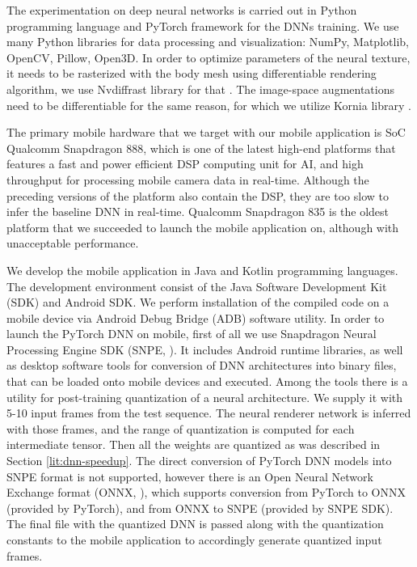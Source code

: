 The experimentation on deep neural networks is carried out in Python programming language and PyTorch framework for the DNNs training. We use many Python libraries for data processing and visualization: NumPy, Matplotlib, OpenCV, Pillow, Open3D. In order to optimize parameters of the neural texture, it needs to be rasterized with the body mesh using differentiable rendering algorithm, we use Nvdiffrast library for that \cite{aux:nvdiffrast20}. The image-space augmentations need to be differentiable for the same reason, for which we utilize Kornia library \cite{aux:kornia20}.

The primary mobile hardware that we target with our mobile application is SoC Qualcomm Snapdragon 888, which is one of the latest high-end platforms that features a fast and power efficient DSP computing unit for AI, and high throughput for processing mobile camera data in real-time. Although the preceding versions of the platform also contain the DSP, they are too slow to infer the baseline DNN in real-time. Qualcomm Snapdragon 835 is the oldest platform that we succeeded to launch the mobile application on, although with unacceptable performance.

We develop the mobile application in Java and Kotlin programming languages. The development environment consist of the Java Software Development Kit (SDK) and Android SDK. We perform installation of the compiled code on a mobile device via Android Debug Bridge (ADB) software utility. In order to launch the PyTorch DNN on mobile, first of all we use Snapdragon Neural Processing Engine SDK (SNPE, \cite{aux:snpe}). It includes Android runtime libraries, as well as desktop software tools for conversion of DNN architectures into binary files, that can be loaded onto mobile devices and executed. Among the tools there is a utility for post-training quantization of a neural architecture. We supply it with 5-10 input frames from the test sequence. The neural renderer network is inferred with those frames, and the range of quantization is computed for each intermediate tensor. Then all the weights are quantized as was described in Section \ref{lit:dnn-speedup}. The direct conversion of PyTorch DNN models into SNPE format is not supported, however there is an Open Neural Network Exchange format (ONNX, \cite{aux:onnx}), which supports conversion from PyTorch to ONNX (provided by PyTorch), and from ONNX to SNPE (provided by SNPE SDK). The final file with the quantized DNN is passed along with the quantization constants to the mobile application to accordingly generate quantized input frames.

